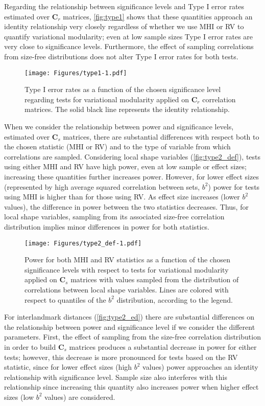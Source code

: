 \documentclass[12pt,]{article}
\begin{document}
Regarding the relationship between significance levels and Type I error
rates estimated over $\mathbf{C}_r$ matrices, \autoref{fig:type1} shows
that these quantities approach an identity relationship very closely
regardless of whether we use MHI or RV to quantify variational
modularity; even at low sample sizes Type I error rates are very close
to significance levels. Furthermore, the effect of sampling correlations
from size-free distributions does not alter Type I error rates for both
tests.

\begin{figure}[htbp]
\centering
\texttt{[image: Figures/type1-1.pdf]}
\caption{Type I error rates as a function of the chosen significance
level regarding tests for variational modularity applied on
$\mathbf{C}_r$ correlation matrices. The solid black line represents the
identity relationship. \label{fig:type1}}
\end{figure}

When we consider the relationship between power and significance levels,
estimated over $\mathbf{C}_s$ matrices, there are substantial
differences with respect both to the chosen statistic (MHI or RV) and to
the type of variable from which correlations are sampled. Considering
local shape variables (\autoref{fig:type2_def}), tests using either MHI
and RV have high power, even at low sample or effect sizes; increasing
these quantities further increases power. However, for lower effect
sizes (represented by high average squared correlation between sets,
$b^2$) power for tests using MHI is higher than for those using RV. As
effect size increases (lower $b^2$ values), the difference in power
between the two statistics decreases. Thus, for local shape variables,
sampling from its associated size-free correlation distribution implies
minor differences in power for both statistics.

\begin{figure}[htbp]
\centering
\texttt{[image: Figures/type2\_def-1.pdf]}
\caption{Power for both MHI and RV statistics as a function of the
chosen significance levels with respect to tests for variational
modularity applied on $\mathbf{C}_s$ matrices with values sampled from
the distribution of correlations between local shape variables. Lines
are colored with respect to quantiles of the $b^2$ distribution,
according to the legend. \label{fig:type2_def}}
\end{figure}

For interlandmark distances (\autoref{fig:type2_ed}) there are
substantial differences on the relationship between power and
significance level if we consider the different parameters. First, the
effect of sampling from the size-free correlation distribution in order
to build $\mathbf{C}_s$ matrices produces a substantial decrease in
power for either tests; however, this decrease is more pronounced for
tests based on the RV statistic, since for lower effect sizes (high
$b^2$ values) power approaches an identity relationship with
significance level. Sample size also interferes with this relationship
since increasing this quantity also increases power when higher effect
sizes (low $b^2$ values) are considered.
\end{document}
